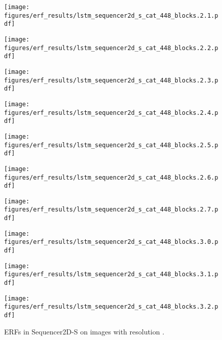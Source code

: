 \documentclass{article}
\begin{document}
\begin{figure}[tb]
\begin{minipage}[t]{0.13\hsize}
    \centering
    \texttt{[image: figures/erf\_results/lstm\_sequencer2d\_s\_cat\_448\_blocks.2.1.pdf]}
    \label{figure:erf_sequencer_448:8}
  \end{minipage}
  \begin{minipage}[t]{0.13\hsize}
    \centering
    \texttt{[image: figures/erf\_results/lstm\_sequencer2d\_s\_cat\_448\_blocks.2.2.pdf]}
    \label{figure:erf_sequencer_448:9}
  \end{minipage}
  \begin{minipage}[t]{0.13\hsize}
    \centering
    \texttt{[image: figures/erf\_results/lstm\_sequencer2d\_s\_cat\_448\_blocks.2.3.pdf]}
    \label{figure:erf_sequencer_448:10}
  \end{minipage}
  \begin{minipage}[t]{0.13\hsize}
    \centering
    \texttt{[image: figures/erf\_results/lstm\_sequencer2d\_s\_cat\_448\_blocks.2.4.pdf]}
    \label{figure:erf_sequencer_448:11}
  \end{minipage}
  \begin{minipage}[t]{0.13\hsize}
    \centering
    \texttt{[image: figures/erf\_results/lstm\_sequencer2d\_s\_cat\_448\_blocks.2.5.pdf]}
    \label{figure:erf_sequencer_448:12}
  \end{minipage}
  \begin{minipage}[t]{0.13\hsize}
    \centering
    \texttt{[image: figures/erf\_results/lstm\_sequencer2d\_s\_cat\_448\_blocks.2.6.pdf]}
    \label{figure:erf_sequencer_448:13}
  \end{minipage}
  \begin{minipage}[t]{0.13\hsize}
    \centering
    \texttt{[image: figures/erf\_results/lstm\_sequencer2d\_s\_cat\_448\_blocks.2.7.pdf]}
    \label{figure:erf_sequencer_448:14}
  \end{minipage}
  \begin{minipage}[t]{0.13\hsize}
    \centering
    \texttt{[image: figures/erf\_results/lstm\_sequencer2d\_s\_cat\_448\_blocks.3.0.pdf]}
    \label{figure:erf_sequencer_448:15}
  \end{minipage}
  \begin{minipage}[t]{0.13\hsize}
    \centering
    \texttt{[image: figures/erf\_results/lstm\_sequencer2d\_s\_cat\_448\_blocks.3.1.pdf]}
    \label{figure:erf_sequencer_448:16}
  \end{minipage}
  \begin{minipage}[t]{0.13\hsize}
    \centering
    \texttt{[image: figures/erf\_results/lstm\_sequencer2d\_s\_cat\_448\_blocks.3.2.pdf]}
    \label{figure:erf_sequencer_448:17}
  \end{minipage}
  \caption{ERFs in Sequencer2D-S on images with resolution .}
    \label{figure:erf_sequencer_448}
\end{figure} 
\end{document}
